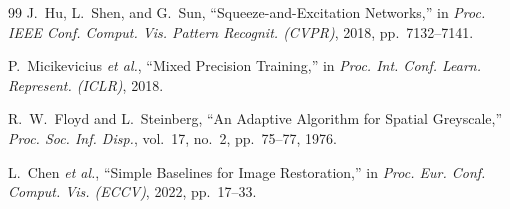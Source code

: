 \documentclass[conference]{IEEEtran}
\newcommand{\etal}{\textit{et al.}}
\begin{document}
\begin{thebibliography}{99}
J.~Hu, L.~Shen, and G.~Sun, ``Squeeze-and-Excitation Networks,'' in \textit{Proc. IEEE Conf. Comput. Vis. Pattern Recognit. (CVPR)}, 2018, pp.~7132--7141.

P.~Micikevicius \etal, ``Mixed Precision Training,'' in \textit{Proc. Int. Conf. Learn. Represent. (ICLR)}, 2018.

R.~W.~Floyd and L.~Steinberg, ``An Adaptive Algorithm for Spatial Greyscale,'' \textit{Proc. Soc. Inf. Disp.}, vol.~17, no.~2, pp.~75--77, 1976.

L.~Chen \etal, ``Simple Baselines for Image Restoration,'' in \textit{Proc. Eur. Conf. Comput. Vis. (ECCV)}, 2022, pp.~17--33.

\end{thebibliography}
\end{document}
